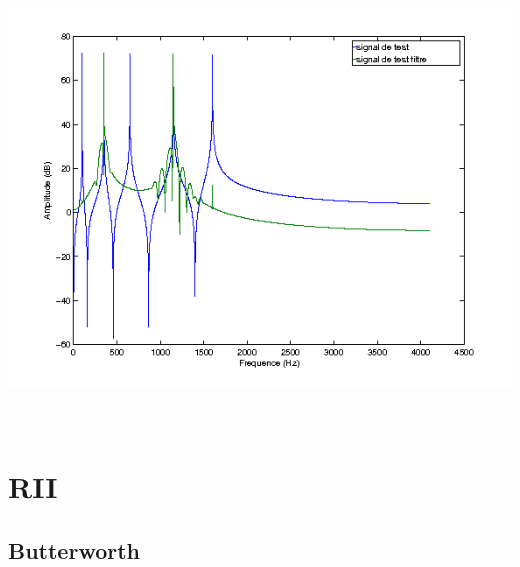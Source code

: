 \documentclass{article}
\begin{document}
\includegraphics[height=12cm]{RIF_3}

\section{RII}
\subsection{Butterworth}
\end{document}
